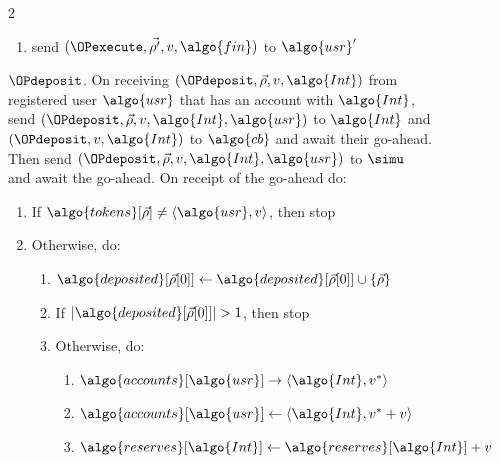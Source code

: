 \begin{figure}
\begin{minipage}{1.1\textwidth}
\begin{framed}
\begin{multicols}{2}
\begin{enumerate}
\begin{enumerate}
            \item send $(\OPexecute,\vec{\rho'}, v, \algo{usr}, \algo{usr}')$
          to $\simu$ 
          
          \end{enumerate}

        \item send $(\OPexecute, \vec{\rho'}, v , \algo{fin})$ to $\algo{usr}'$

      \end{enumerate}

      {$\OPdeposit$.} On receiving $(\OPdeposit, \vec{\rho}, v,
      \algo{Int})$ from registered user $\algo{usr}$ that has an account with
      $\algo{Int}$, send $(\OPdeposit, \vec{\rho}, v, \algo{Int},
      \algo{usr})$ to $\algo{Int}$ and $(\OPdeposit, v, \algo{Int})$ to
      $\algo{cb}$ and await their go-ahead. Then send $(\OPdeposit,
      \vec{\rho}, v, \algo{Int}, \algo{usr})$ to $\simu$ and await the
      go-ahead. On receipt of the go-ahead do:

      \begin{enumerate}

        \item If $\algo{tokens}[\vec{\rho}] \neq \langle \algo{usr}, v
          \rangle$, then stop

        \item Otherwise, do:

          \begin{enumerate}

            \item $\algo{deposited}[\vec{\rho}[0]] \gets
              \algo{deposited}[\vec{\rho}[0]] \cup \{\vec{\rho}\}$

            \item If $|\algo{deposited}[\vec{\rho}[0]]| > 1$, then stop

            \item Otherwise, do:


              \begin{enumerate}

                \item $\algo{accounts}[\algo{usr}] \rightarrow \langle
                  \algo{Int}, v^*\rangle$

                \item $\algo{accounts}[\algo{usr}] \gets \langle \algo{Int},
                  v^*+v \rangle$

                \item $\algo{reserves}[\algo{Int}] \gets
                  \algo{reserves}[\algo{Int}] + v$


\end{enumerate}
\end{enumerate}
\end{enumerate}
\end{multicols}
\end{framed}
\end{minipage}
\end{figure}

